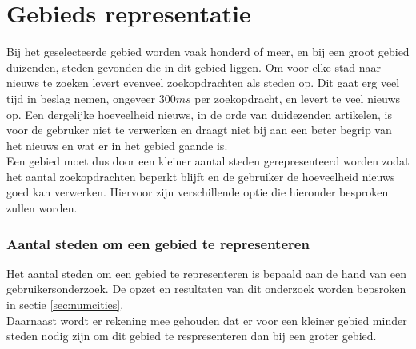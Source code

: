 \documentclass[twoside,openright]{uva-bachelor-thesis}
\begin{document}
	\section{Gebieds representatie}
		Bij het geselecteerde gebied worden vaak honderd of meer, en bij een groot gebied duizenden, steden gevonden die in dit gebied liggen. Om voor elke stad naar nieuws te zoeken levert evenveel zoekopdrachten als steden op. Dit gaat erg veel tijd in beslag nemen, ongeveer $300ms$ per zoekopdracht, en levert te veel nieuws op. Een dergelijke hoeveelheid nieuws, in de orde van duidezenden artikelen, is voor de gebruker niet te verwerken en draagt niet bij aan een beter begrip van het nieuws en wat er in het gebied gaande is.
		\\[0.5cm]
		Een gebied moet dus door een kleiner aantal steden gerepresenteerd worden zodat het aantal zoekopdrachten beperkt blijft en de gebruiker de hoeveelheid nieuws goed kan verwerken. Hiervoor zijn verschillende optie die hieronder besproken zullen worden.
		
		\subsubsection{Aantal steden om een gebied te representeren}
			Het aantal steden om een gebied te representeren is bepaald aan de hand van een gebruikersonderzoek. De opzet en resultaten van dit onderzoek worden bepsroken in sectie \ref{sec:numcities}.
			\\[0.5cm]
			Daarnaast wordt er rekening mee gehouden dat er voor een kleiner gebied minder steden nodig zijn om dit gebied te respresenteren dan bij een groter gebied.
\end{document}
